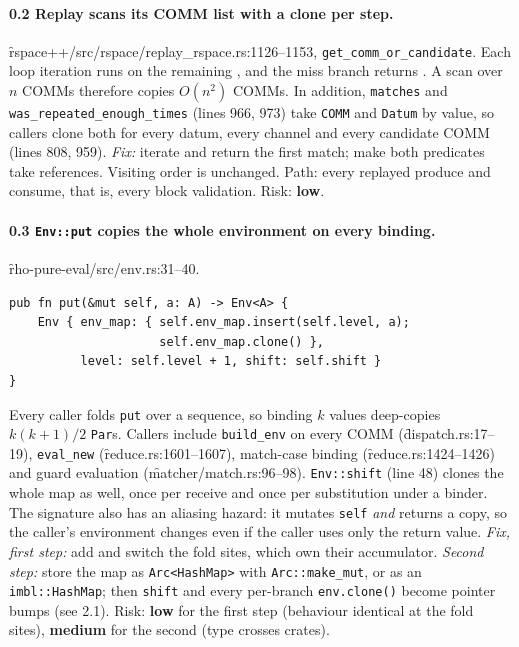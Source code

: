 \documentclass[11pt]{article}
\newcommand{\low}{\textcolor{lo}{\textbf{low}}}
\newcommand{\medium}{\textcolor{med}{\textbf{medium}}}
\begin{document}
\paragraph{0.2 Replay scans its COMM list with a clone per step.}
\f{rspace++/src/rspace/replay_rspace.rs}:1126--1153, \texttt{get\_comm\_or\_candidate}. Each
loop iteration runs  on the remaining , and the miss branch
returns . A scan over $n$ COMMs therefore copies $O(n^2)$ COMMs. In
addition, \texttt{matches} and \texttt{was\_repeated\_enough\_times} (lines 966, 973) take
\texttt{COMM} and \texttt{Datum} by value, so callers clone both for every datum, every channel
and every candidate COMM (lines 808, 959). \emph{Fix:} iterate  and return the
first match; make both predicates take references. Visiting order is unchanged.
Path: every replayed produce and consume, that is, every block validation.
Risk: \low{}.

\paragraph{0.3 \texttt{Env::put} copies the whole environment on every binding.}
\f{rho-pure-eval/src/env.rs}:31--40.
\begin{lstlisting}
pub fn put(&mut self, a: A) -> Env<A> {
    Env { env_map: { self.env_map.insert(self.level, a);
                     self.env_map.clone() },
          level: self.level + 1, shift: self.shift }
}
\end{lstlisting}
Every caller folds \texttt{put} over a sequence, so binding $k$ values deep-copies
$k(k+1)/2$ \texttt{Par}s. Callers include \texttt{build\_env} on every COMM
(\f{dispatch.rs}:17--19), \texttt{eval\_new} (\f{reduce.rs}:1601--1607), match-case binding
(\f{reduce.rs}:1424--1426) and guard evaluation (\f{matcher/match.rs}:96--98).
\texttt{Env::shift} (line 48) clones the whole map as well, once per receive and once per
substitution under a binder. The signature also has an aliasing hazard: it mutates
\texttt{self} \emph{and} returns a copy, so the caller's environment changes even if the caller
uses only the return value. \emph{Fix, first step:} add 
and switch the fold sites, which own their accumulator. \emph{Second step:} store the map as
\texttt{Arc<HashMap>} with \texttt{Arc::make\_mut}, or as an \texttt{imbl::HashMap}; then
\texttt{shift} and every per-branch \texttt{env.clone()} become pointer bumps (see 2.1).
Risk: \low{} for the first step (behaviour identical at the fold sites), \medium{} for the
second (type crosses crates).
\end{document}
